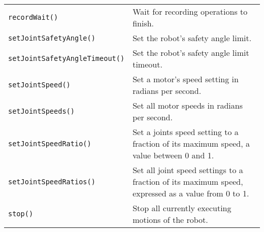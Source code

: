 \begin{table}[!h]
\begin{center}
\begin{tabular}{p{48 mm}p{110 mm}}
\texttt{recordWait()} & Wait for recording operations to finish. \\
\texttt{setJointSafetyAngle()} & Set the robot's safety angle limit. \\
\texttt{setJointSafetyAngleTimeout()} & Set the robot's safety angle limit timeout. \\
\texttt{setJointSpeed()} & Set a motor's speed setting in radians per second. \\
\texttt{setJointSpeeds()} & Set all motor speeds in radians per second. \\
\texttt{setJointSpeedRatio()} & Set a joints speed setting to a fraction of its maximum speed, a value between 0 and 1. \\
\texttt{setJointSpeedRatios()} & Set all joint speed settings to a fraction of its
maximum speed, expressed as a value from 0 to 1. \\
\texttt{stop()} & Stop all currently executing motions of the robot. \\
\hline
\end{tabular}
\end{center}
\label{mobilec_api_cbinary}
\end{table}

